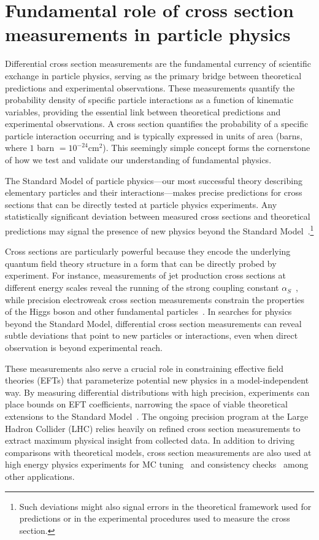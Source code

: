 \section{Fundamental role of cross section measurements in particle physics}

Differential cross section measurements are the fundamental currency of scientific exchange in particle physics, serving as the primary bridge between theoretical predictions and experimental observations.
%
These measurements quantify the probability density of specific particle interactions as a function of kinematic variables, providing the essential link between theoretical predictions and experimental observations.
%
 A cross section quantifies the probability of a specific particle interaction occurring and is typically expressed in units of area (barns, where $1$ barn $= 10^{-24} \mathrm{cm}^2$). This seemingly simple concept forms the cornerstone of how we test and validate our understanding of fundamental physics.
 
The Standard Model of particle physics---our most successful theory describing elementary particles and their interactions---makes precise predictions for cross sections that can be directly tested at particle physics experiments.
%
Any statistically significant deviation between measured cross sections and theoretical predictions may signal the presence of new physics beyond the Standard Model~\cite{particle_data_group_review_2022}.\footnote{Such deviations might also signal errors in the theoretical framework used for predictions or in the experimental procedures used to measure the cross section.
} 

Cross sections are particularly powerful because they encode the underlying quantum field theory structure in a form that can be directly probed by experiment.
%
For instance, measurements of jet production cross sections at different energy scales reveal the running of the strong coupling constant \(\alpha_S\)~\cite{chiefa_parton_2025}, while precision electroweak cross section measurements constrain the properties of the Higgs boson and other fundamental particles~\cite{noauthor_precision_2006}.
%
In searches for physics beyond the Standard Model, differential cross section measurements can reveal subtle deviations that point to new particles or interactions, even when direct observation is beyond experimental reach.

These measurements also serve a crucial role in constraining effective field theories (EFTs) that parameterize potential new physics in a model-independent way.
%
By measuring differential distributions with high precision, experiments can place bounds on EFT coefficients, narrowing the space of viable theoretical extensions to the Standard Model~\cite{contino_validity_2016}.
%
The ongoing precision program at the Large Hadron Collider (LHC) relies heavily on refined cross section measurements to extract maximum physical insight from collected data.
%
In addition to driving comparisons with theoretical models, cross section measurements are also used at high energy physics experiments for MC tuning~\cite{albert_antares_2025} and consistency checks~\cite{buckley_constraints_2025} among other applications.

